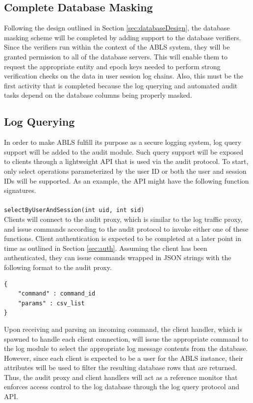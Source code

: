 \documentclass{sig-alternate}
\begin{document}
\subsection{Complete Database Masking}
Following the design outlined in Section \ref{sec:databaseDesign}, the database masking scheme will be completed by
adding support to the database verifiers. Since the verifiers run within the context of the ABLS system, they will be granted
permission to all of the database servers. This will enable them to request the appropriate entity and epoch keys 
needed to perform strong verification checks on the data in user session log chains. Also, this must be the first 
activity that is completed because the log querying and automated audit tasks depend on the database columns 
being properly masked. 

\subsection{Log Querying}
\label{sec:querying}
In order to make ABLS fulfill its purpose as a secure logging system, log query support will be added to the audit
module. Such query support will be exposed to clients through a lightweight API that is used via the audit protocol.
To start, only select operations parameterized by the user ID or both the user and session IDs will be supported. 
As an example, the API might have the following function signatures. \\

 \\
{\tt selectByUserAndSession(int uid, int sid)}\\

Clients will connect to the audit proxy, which is similar to the log traffic proxy, and issue commands according to
the audit protocol to invoke either one of these functions. Client authentication is expected to be completed at a later
point in time as outlined in Section \ref{sec:auth}. Assuming the client has been authenticated, they can issue commands
wrapped in JSON strings with the following format to the audit proxy. \\

\begin{lstlisting}
{     
    "command" : command_id
    "params" : csv_list
}
\end{lstlisting}

Upon receiving and parsing an incoming command, the client handler, which is spawned to handle each client connection,
will issue the appropriate command to the log module to select the appropriate log message contents from the database. 
However, since each client is expected to be a user for the ABLS instance, their attributes will be used to filter 
the resulting database rows that are returned. Thus, the audit proxy and client handlers will act
as a reference monitor that enforces access control to the log database through the log query protocol and API.
\end{document}
